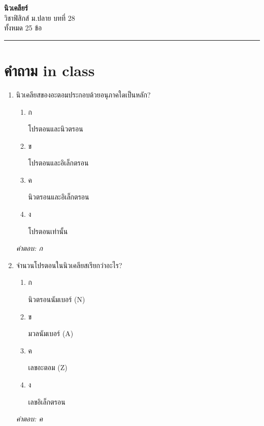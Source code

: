 \documentclass[12pt]{article}
\begin{document}
\begin{center}
{\Large\textbf{นิวเคลียร์}}\\[6pt]
{\normalsize วิชาฟิสิกส์ ม.ปลาย บทที่ 28}\\[4pt]
{\footnotesize ทั้งหมด 25 ข้อ}
\end{center}
\hrule
\bigskip

\section*{คำถาม in class}
\begin{enumerate}[label=\arabic*., itemsep=0.5\baselineskip, topsep=0.5\baselineskip, leftmargin=*]
\item นิวเคลียสของอะตอมประกอบด้วยอนุภาคใดเป็นหลัก?
\begin{enumerate}[label=\alph*)., itemsep=0.3\baselineskip, topsep=0.3\baselineskip]
\item ก\ 
\begin{minipage}[t]{0.9\linewidth}
\raggedright โปรตอนและนิวตรอน
\end{minipage}
\item ข\ 
\begin{minipage}[t]{0.9\linewidth}
\raggedright โปรตอนและอิเล็กตรอน
\end{minipage}
\item ค\ 
\begin{minipage}[t]{0.9\linewidth}
\raggedright นิวตรอนและอิเล็กตรอน
\end{minipage}
\item ง\ 
\begin{minipage}[t]{0.9\linewidth}
\raggedright โปรตอนเท่านั้น
\end{minipage}
\end{enumerate}
\vspace{-0.3\baselineskip}
\begin{small}
\textit{คำตอบ: ก}
\end{small}

\item จำนวนโปรตอนในนิวเคลียสเรียกว่าอะไร?
\begin{enumerate}[label=\alph*)., itemsep=0.3\baselineskip, topsep=0.3\baselineskip]
\item ก\ 
\begin{minipage}[t]{0.9\linewidth}
\raggedright นิวตรอนนัมเบอร์ (N)
\end{minipage}
\item ข\ 
\begin{minipage}[t]{0.9\linewidth}
\raggedright มวลนัมเบอร์ (A)
\end{minipage}
\item ค\ 
\begin{minipage}[t]{0.9\linewidth}
\raggedright เลขอะตอม (Z)
\end{minipage}
\item ง\ 
\begin{minipage}[t]{0.9\linewidth}
\raggedright เลขอิเล็กตรอน
\end{minipage}
\end{enumerate}
\vspace{-0.3\baselineskip}
\begin{small}
\textit{คำตอบ: ค}
\end{small}


\end{enumerate}
\end{document}
